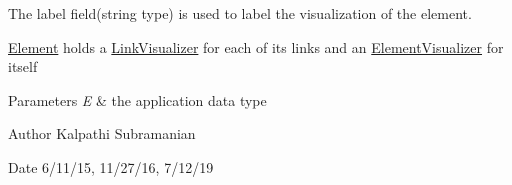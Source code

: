 The label field(string type) is used to label the visualization of the element.

\mbox{\hyperlink{classbridges_1_1datastructure_1_1_element}{Element}} holds a \mbox{\hyperlink{classbridges_1_1datastructure_1_1_link_visualizer}{Link\+Visualizer}} for each of its links and an \mbox{\hyperlink{classbridges_1_1datastructure_1_1_element_visualizer}{Element\+Visualizer}} for itself


\begin{DoxyParams}{Parameters}
{\em E} & the application data type\\
\hline
\end{DoxyParams}
\begin{DoxyAuthor}{Author}
Kalpathi Subramanian
\end{DoxyAuthor}
\begin{DoxyDate}{Date}
6/11/15, 11/27/16, 7/12/19 
\end{DoxyDate}
